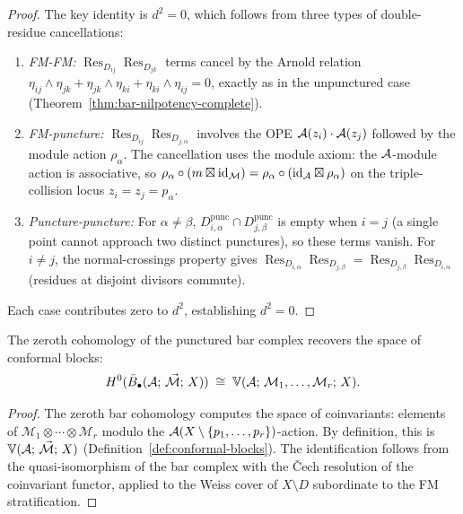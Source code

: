 \begin{proof}
The key identity is $d^2 = 0$, which follows from
three types of double-residue cancellations:
\begin{enumerate}
\item \emph{FM-FM:} $\operatorname{Res}_{D_{ij}}
  \operatorname{Res}_{D_{jk}}$ terms cancel by the Arnold
  relation $\eta_{ij} \wedge \eta_{jk} + \eta_{jk} \wedge
  \eta_{ki} + \eta_{ki} \wedge \eta_{ij} = 0$, exactly as
  in the unpunctured case
  (Theorem~\ref{thm:bar-nilpotency-complete}).
\item \emph{FM-puncture:} $\operatorname{Res}_{D_{ij}}
  \operatorname{Res}_{D_{j,\alpha}}$ involves the OPE
  $\mathcal{A}(z_i) \cdot \mathcal{A}(z_j)$ followed by the module action
  $\rho_\alpha$.  The cancellation uses the module axiom:
  the $\mathcal{A}$-module action is associative, so
  $\rho_\alpha \circ (m \boxtimes \mathrm{id}_{\mathcal{M}})
  = \rho_\alpha \circ (\mathrm{id}_{\mathcal{A}} \boxtimes \rho_\alpha)$
  on the triple-collision locus $z_i = z_j = p_\alpha$.
\item \emph{Puncture-puncture:} For $\alpha \neq \beta$,
  $D_{i,\alpha}^{\mathrm{punc}} \cap D_{j,\beta}^{\mathrm{punc}}$
  is empty when $i = j$ (a single point cannot approach two
  distinct punctures), so these terms vanish.  For $i \neq j$,
  the normal-crossings property gives
  $\operatorname{Res}_{D_{i,\alpha}}
  \operatorname{Res}_{D_{j,\beta}}
  = \operatorname{Res}_{D_{j,\beta}}
  \operatorname{Res}_{D_{i,\alpha}}$
  (residues at disjoint divisors commute).
\end{enumerate}
Each case contributes zero to $d^2$, establishing
$d^2 = 0$.
\end{proof}

\begin{corollary}
\label{cor:conformal-blocks-punctured-bar}
The zeroth cohomology of the punctured bar complex recovers
the space of conformal blocks:
\[
H^0(\bar{B}_\bullet(\mathcal{A};\, \vec{\mathcal{M}};\, X))
\;\cong\;
\mathbb{V}(\mathcal{A};\, \mathcal{M}_1, \ldots, \mathcal{M}_r;\, X).
\]
\end{corollary}

\begin{proof}
The zeroth bar cohomology computes the space of coinvariants:
elements of $\mathcal{M}_1 \otimes \cdots \otimes \mathcal{M}_r$
modulo the $\mathcal{A}(X \setminus \{p_1, \ldots, p_r\})$-action.
By definition, this is $\mathbb{V}(\mathcal{A};\, \vec{\mathcal{M}};\, X)$
(Definition~\ref{def:conformal-blocks}).
The identification follows from the quasi-isomorphism
of the bar complex with the Čech resolution of the
coinvariant functor, applied to the Weiss cover
of $X \setminus D$ subordinate to the FM stratification.
\end{proof}

